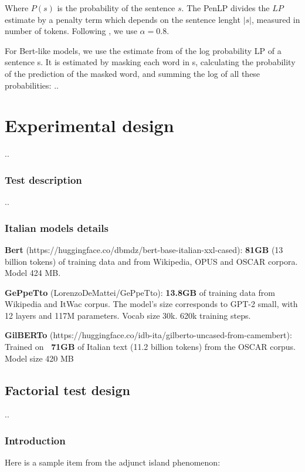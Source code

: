 Where \( P(s) \) is the probability of the sentence \( s \). The PenLP divides the \( LP \) estimate by a penalty term which depends on the sentence lenght \( |s| \), measured in number of tokens. Following \citet{lau2020furiously}, we use \( \alpha=0.8 \).

For Bert-like models, we use the estimate from \citet{lau2020furiously} of the log probability LP of a sentence s. It is estimated by masking each word in s, calculating the probability of the prediction of the masked word, and summing the log of all these probabilities:
..


\chapter{Experimental design}
..

\subsection{Test description}
..

\subsection{Italian models details}

\textbf{Bert} (https://huggingface.co/dbmdz/bert-base-italian-xxl-cased): \textbf{81GB} (13 billion tokens) of training data  and from Wikipedia, OPUS and OSCAR corpora. Model 
 424 MB.

\textbf{GePpeTto} (LorenzoDeMattei/GePpeTto): \textbf{13.8GB} of training data from Wikipedia and ItWac corpus. The model’s size corresponds to GPT-2 small, with 12 layers and 117M parameters. Vocab size 30k. 620k training steps.

\textbf{GilBERTo} (https://huggingface.co/idb-ita/gilberto-uncased-from-camembert): Trained on \textbf{~71GB} of Italian text (11.2 billion tokens) from the OSCAR corpus. Model size 420 MB


\section{Factorial test design}
..



\subsection{Introduction}

Here is a sample item from the adjunct island phenomenon: %

